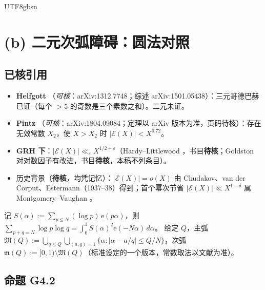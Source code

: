 \documentclass[11pt,a4paper]{article}
\newcommand{\ee}{\mathrm e}
\newcommand{\Exc}{\mathcal E}          %
\newcommand{\Maj}{\mathfrak M}
\newcommand{\Min}{\mathfrak m}
\theoremstyle{plain}
\theoremstyle{definition}
\begin{document}
\begin{CJK}{UTF8}{gbsn}
\section{(b) 二元次弧障碍：圆法对照}\label{g4:sec:circle}

\subsection{已核引用}
\begin{itemize}[leftmargin=*]
\item \textbf{Helfgott} \cite{Hel13,Hel15}（\emph{可核}：arXiv:1312.7748；综述 arXiv:1501.05438）：三元哥德巴赫已证（每个 $>5$ 的奇数是三个素数之和）。二元未证。
\item \textbf{Pintz} \cite{Pin18}（\emph{可核}：arXiv:1804.09084；定理以 arXiv 版本为准，页码待核）：存在无效常数 $X_2$，使 $X>X_2$ 时 $|\Exc(X)|<X^{0.72}$。
\item \textbf{GRH 下}：$|\Exc(X)|\ll_\varepsilon X^{1/2+\varepsilon}$（Hardy--Littlewood \cite{HL24}，书目\textbf{待核}；Goldston 对对数因子有改进，书目\textbf{待核}，本稿不列条目）。
\item 历史背景（\textbf{待核}，均凭记忆）：$|\Exc(X)|=o(X)$ 由 Chudakov、van der Corput、Estermann（1937--38）得到；首个幂次节省 $|\Exc(X)|\ll X^{1-\delta}$ 属 Montgomery--Vaughan \cite{MV75}。
\end{itemize}

记 $S(\alpha):=\sum_{p\le N}(\log p)\,\ee(p\alpha)$，则 $\sum_{p+q=N}\log p\log q=\int_0^1S(\alpha)^2\ee(-N\alpha)\,d\alpha$。
给定 $Q$，主弧 $\Maj(Q):=\bigcup_{q\le Q}\bigcup_{(a,q)=1}\{\alpha:|\alpha-a/q|\le Q/N\}$，次弧 $\Min(Q):=[0,1)\setminus\Maj(Q)$（标准设定的一个版本，常数取法以文献为准）。

\subsection{命题 G4.2}


\end{CJK}
\end{document}
